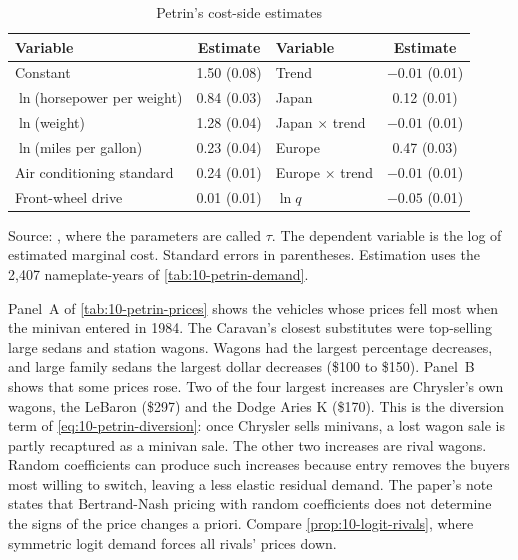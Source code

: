 \begin{table}[htbp]
\centering
\caption{Petrin's cost-side estimates}\label{tab:10-petrin-cost}
\small
\begin{tabular}{@{}lc@{\qquad}lc@{}}
\toprule
Variable & Estimate & Variable & Estimate \\
\midrule
Constant                         & 1.50 (0.08) & Trend                  & $-0.01$ (0.01) \\
$\ln$(horsepower per weight)     & 0.84 (0.03) & Japan                  & 0.12 (0.01) \\
$\ln$(weight)                    & 1.28 (0.04) & Japan $\times$ trend   & $-0.01$ (0.01) \\
$\ln$(miles per gallon)          & 0.23 (0.04) & Europe                 & 0.47 (0.03) \\
Air conditioning standard        & 0.24 (0.01) & Europe $\times$ trend  & $-0.01$ (0.01) \\
Front-wheel drive                & 0.01 (0.01) & $\ln q$                & $-0.05$ (0.01) \\
\bottomrule
\end{tabular}

\smallskip
\begin{minipage}{0.86\textwidth}
\footnotesize Source: \citet[Table~6]{Petrin2002}, where the parameters are called $\tau$. The dependent variable is
the log of estimated marginal cost. Standard errors in parentheses. Estimation uses the 2,407 nameplate-years of
\cref{tab:10-petrin-demand}.
\end{minipage}
\end{table}

 Panel~A of \cref{tab:10-petrin-prices} shows the vehicles whose prices fell most when the
minivan entered in 1984. The Caravan's closest substitutes were top-selling large sedans and station wagons. Wagons
had the largest percentage decreases, and large family sedans the largest dollar decreases (\$100 to \$150). Panel~B
shows that some prices rose. Two of the four largest increases are Chrysler's own wagons, the LeBaron (\$297) and the
Dodge Aries K (\$170). This is the diversion term of \eqref{eq:10-petrin-diversion}: once Chrysler sells minivans, a
lost wagon sale is partly recaptured as a minivan sale. The other two increases are rival wagons. Random coefficients
can produce such increases because entry removes the buyers most willing to switch, leaving a less elastic residual
demand. The paper's note states that Bertrand-Nash pricing with random coefficients does not determine the signs of
the price changes a priori. Compare \cref{prop:10-logit-rivals}, where symmetric logit demand forces all rivals'
prices down.

